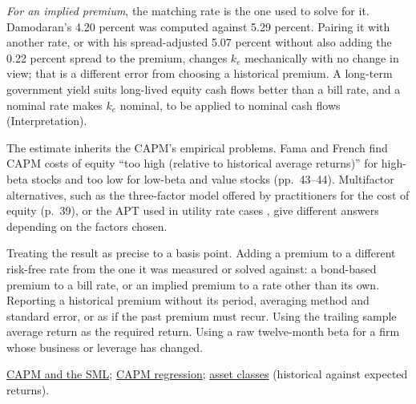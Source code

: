 \begin{qfmethod}
\emph{For an implied premium}, the matching rate is the one used to solve for it. Damodaran's 4.20 percent was computed against 5.29 percent. Pairing it with another rate, or with his spread-adjusted 5.07 percent without also adding the 0.22 percent spread to the premium, changes $k_e$ mechanically with no change in view; that is a different error from choosing a historical premium. A long-term government yield suits long-lived equity cash flows better than a bill rate, and a nominal rate makes $k_e$ nominal, to be applied to nominal cash flows (Interpretation).

The estimate inherits the CAPM's empirical problems. Fama and French find CAPM costs of equity ``too high (relative to historical average returns)'' for high-beta stocks and too low for low-beta and value stocks (pp.~43--44). Multifactor alternatives, such as the three-factor model offered by practitioners for the cost of equity (p.~39), or the APT used in utility rate cases \citep[FRBNY Staff Report 216, August 2005, sec.~9]{arbitrage-pricing-review-2005}, give different answers depending on the factors chosen.

 Treating the result as precise to a basis point. Adding a premium to a different risk-free rate from the one it was measured or solved against: a bond-based premium to a bill rate, or an implied premium to a rate other than its own. Reporting a historical premium without its period, averaging method and standard error, or as if the past premium must recur. Using the trailing sample average return as the required return. Using a raw twelve-month beta for a firm whose business or leverage has changed.

 \hyperref[mod:capm-sml]{CAPM and the SML}; \hyperref[meth:capm-regression]{CAPM regression}; \hyperref[def:asset-class-characteristics]{asset classes} (historical against expected returns).

\end{qfmethod}

